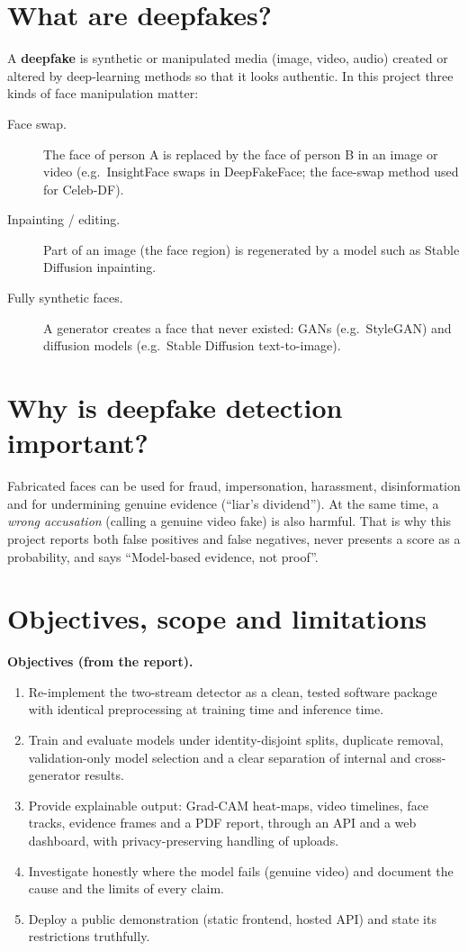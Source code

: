 \documentclass[11pt,a4paper]{report}
\begin{document}
\section{What are deepfakes?}
A \textbf{deepfake} is synthetic or manipulated media (image, video, audio) created or altered by deep-learning methods so that it looks authentic. In this project three kinds of face manipulation matter:
\begin{description}
\item[Face swap.] The face of person A is replaced by the face of person B in an image or video (e.g.\ InsightFace swaps in DeepFakeFace; the face-swap method used for Celeb-DF).
\item[Inpainting / editing.] Part of an image (the face region) is regenerated by a model such as Stable Diffusion inpainting.
\item[Fully synthetic faces.] A generator creates a face that never existed: GANs (e.g.\ StyleGAN) and diffusion models (e.g.\ Stable Diffusion text-to-image).
\end{description}

\section{Why is deepfake detection important?}
Fabricated faces can be used for fraud, impersonation, harassment, disinformation and for undermining genuine evidence (``liar's dividend''). At the same time, a \emph{wrong accusation} (calling a genuine
video fake) is also harmful. That is why this project reports both false positives and false negatives, never presents a score as a probability, and says ``Model-based evidence, not proof''.

\section{Objectives, scope and limitations}
\textbf{Objectives (from the report).}
\begin{enumerate}[label=O\arabic*.]
\item Re-implement the two-stream detector as a clean, tested software package with identical preprocessing at training time and inference time.
\item Train and evaluate models under identity-disjoint splits, duplicate removal, validation-only model selection and a clear separation of internal and cross-generator results.
\item Provide explainable output: Grad-CAM heat-maps, video timelines, face tracks, evidence frames and a PDF report, through an API and a web dashboard, with privacy-preserving handling of uploads.
\item Investigate honestly where the model fails (genuine video) and document the cause and the limits of every claim.
\item Deploy a public demonstration (static frontend, hosted API) and state its restrictions truthfully.
\end{enumerate}
\end{document}
